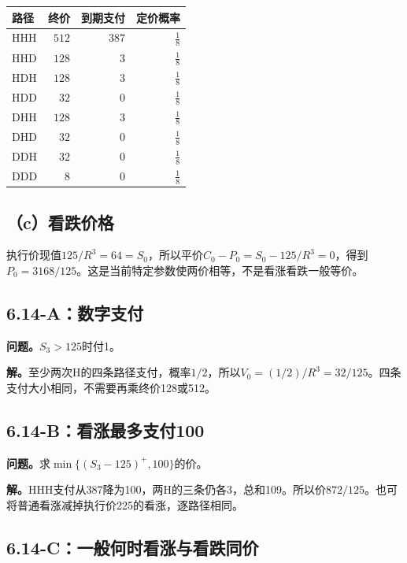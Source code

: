 \documentclass[11pt,a4paper,UTF8,fontset=fandol]{ctexart}
\begin{document}
\begin{longtable}[]{@{}lrrr@{}}
\toprule\noalign{}
路径 & 终价 & 到期支付 & 定价概率 \\
\midrule\noalign{}
\endhead
\bottomrule\noalign{}
\endlastfoot
HHH & \(512\) & \(387\) & \(\frac{1}{8}\) \\
HHD & \(128\) & \(3\) & \(\frac{1}{8}\) \\
HDH & \(128\) & \(3\) & \(\frac{1}{8}\) \\
HDD & \(32\) & \(0\) & \(\frac{1}{8}\) \\
DHH & \(128\) & \(3\) & \(\frac{1}{8}\) \\
DHD & \(32\) & \(0\) & \(\frac{1}{8}\) \\
DDH & \(32\) & \(0\) & \(\frac{1}{8}\) \\
DDD & \(8\) & \(0\) & \(\frac{1}{8}\) \\
\end{longtable}

\endgroup

\subsection{（c）看跌价格}\label{cux770bux8dccux4ef7ux683c}

执行价现值\(125/R^3=64=S_0\)，所以平价\(C_0-P_0=S_0-125/R^3=0\)，得到\(\boxed{P_0=3168/125}\)。这是当前特定参数使两价相等，不是看涨看跌一般等价。

\subsection{6.14-A：数字支付}\label{aux6570ux5b57ux652fux4ed8}

\textbf{问题。}\(S_3>125\)时付1。

\textbf{解。}至少两次H的四条路径支付，概率\(1/2\)，所以\(\boxed{V_0=(1/2)/R^3=32/125}\)。四条支付大小相同，不需要再乘终价128或512。

\subsection{6.14-B：看涨最多支付100}\label{bux770bux6da8ux6700ux591aux652fux4ed8100}

\textbf{问题。}求\(\min\{(S_3-125)^+,100\}\)的价。

\textbf{解。}HHH支付从387降为100，两H的三条仍各3，总和109。所以价\(\boxed{872/125}\)。也可将普通看涨减掉执行价225的看涨，逐路径相同。

\subsection{6.14-C：一般何时看涨与看跌同价}\label{cux4e00ux822cux4f55ux65f6ux770bux6da8ux4e0eux770bux8dccux540cux4ef7}
\end{document}
